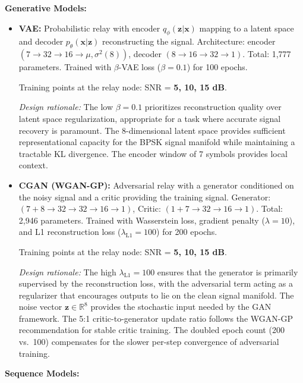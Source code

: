 \documentclass[
  english,
  12pt,
  12pt,
  a4paper,
  oneside]{report}
\begin{document}
\textbf{Generative Models:}

\begin{itemize}
\item
  \textbf{VAE:} Probabilistic relay with encoder \(q_\phi(\mathbf{z}|\mathbf{x})\) mapping to a latent space and decoder \(p_\theta(\mathbf{x}|\mathbf{z})\) reconstructing the signal. Architecture: encoder \((7 \to 32 \to 16 \to \mu, \sigma^2(8))\), decoder \((8 \to 16 \to 32 \to 1)\). Total: 1,777 parameters. Trained with \(\beta\)-VAE loss (\(\beta=0.1\)) for 100 epochs.

  Training points at the relay node: SNR = \textbf{5, 10, 15 dB}.

  \emph{Design rationale:} The low \(\beta = 0.1\) prioritizes reconstruction quality over latent space regularization, appropriate for a task where accurate signal recovery is paramount. The 8-dimensional latent space provides sufficient representational capacity for the BPSK signal manifold while maintaining a tractable KL divergence. The encoder window of 7 symbols provides local context.
\item
  \textbf{CGAN (WGAN-GP):} Adversarial relay with a generator conditioned on the noisy signal and a critic providing the training signal. Generator: \((7+8 \to 32 \to 32 \to 16 \to 1)\), Critic: \((1+7 \to 32 \to 16 \to 1)\). Total: 2,946 parameters. Trained with Wasserstein loss, gradient penalty (\(\lambda=10\)), and L1 reconstruction loss (\(\lambda_{\text{L1}}=100\)) for 200 epochs.

  Training points at the relay node: SNR = \textbf{5, 10, 15 dB}.

  \emph{Design rationale:} The high \(\lambda_{\text{L1}} = 100\) ensures that the generator is primarily supervised by the reconstruction loss, with the adversarial term acting as a regularizer that encourages outputs to lie on the clean signal manifold. The noise vector \(\mathbf{z} \in \mathbb{R}^8\) provides the stochastic input needed by the GAN framework. The 5:1 critic-to-generator update ratio follows the WGAN-GP recommendation for stable critic training. The doubled epoch count (200 vs.~100) compensates for the slower per-step convergence of adversarial training.
\end{itemize}

\textbf{Sequence Models:}
\end{document}
